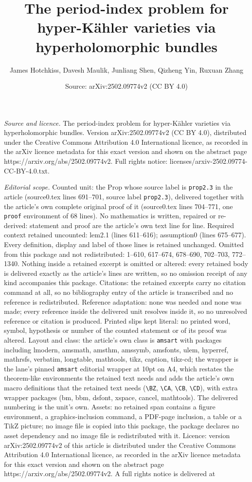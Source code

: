 \documentclass[10pt,a4paper]{amsart}
\title[The period-index problem for hyper-K\"ahler varieties via hy]{The period-index problem for hyper-K\"ahler varieties via hyperholomorphic bundles}
\author{James Hotchkiss, Davesh Maulik, Junliang Shen, Qizheng Yin, Ruxuan Zhang}
\date{Source: arXiv:2502.09774v2 (CC BY 4.0)}
\begin{document}
\maketitle

\noindent\emph{Source and licence.} The period-index problem for hyper-K\"ahler varieties via hyperholomorphic bundles. Version arXiv:2502.09774v2 (CC BY 4.0), distributed under the Creative Commons Attribution 4.0 International licence, as recorded in the arXiv licence metadata for this exact version and shown on the abstract page https://arxiv.org/abs/2502.09774v2. Full rights notice: licenses/arxiv-2502.09774-CC-BY-4.0.txt.\par\smallskip

\noindent\textit{Editorial scope.} Counted unit: the Prop whose source label is \texttt{prop2.3} in the article (source0.tex lines 691--701, source label \texttt{prop2.3}), delivered together with the article's own complete original proof of it (source0.tex lines 704--771, one \texttt{proof} environment of 68 lines). No mathematics is written, repaired or re-derived: statement and proof are the article's own text line for line. Required context retained uncounted: lem2.1 (lines 611--616); assumption0 (lines 675--677). Every definition, display and label of those lines is retained unchanged. Omitted from this package and not redistributed: 1--610, 617--674, 678--690, 702--703, 772--1340. Nothing inside a retained excerpt is omitted or altered: every retained body is delivered exactly as the article's lines are written, so no omission receipt of any kind accompanies this package. Citations: the retained excerpts carry no citation command at all, so no bibliography entry of the article is transcribed and no reference is redistributed. Reference adaptation: none was needed and none was made; every reference inside the delivered unit resolves inside it, so no unresolved reference or citation is produced. Printed slips kept literal: no printed word, symbol, hypothesis or number of the counted statement or of its proof was altered. Layout and class: the article's own class is \texttt{amsart} with packages including lmodern, amsmath, amsthm, amssymb, amsfonts, ulem, hyperref, mathrsfs, verbatim, longtable, mathtools, tikz, caption, tikz-cd; the wrapper is the lane's pinned \texttt{amsart} editorial wrapper at 10pt on A4, which restates the theorem-like environments the retained text needs and adds the article's own macro definitions that the retained text needs (\texttt{\textbackslash BZ}, \texttt{\textbackslash CA}, \texttt{\textbackslash CB}, \texttt{\textbackslash CD}), with extra wrapper packages (bm, bbm, dsfont, xspace, cancel, mathtools). The delivered numbering is the unit's own. Assets: no retained span contains a figure environment, a graphics-inclusion command, a PDF-page inclusion, a table or a TikZ picture; no image file is copied into this package, the package declares no asset dependency and no image file is redistributed with it. Licence: version arXiv:2502.09774v2 of this article is distributed under the Creative Commons Attribution 4.0 International licence, as recorded in the arXiv licence metadata for this exact version and shown on the abstract page https://arxiv.org/abs/2502.09774v2. A full rights notice is delivered at 
\end{document}
